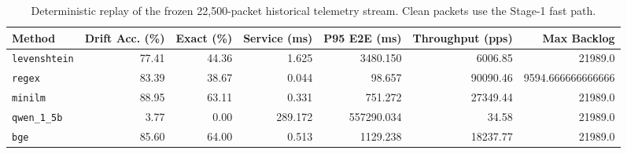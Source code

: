 \begin{table}[t]
\centering
\small
\begin{tabular}{lrrrrrr}
\toprule
Method & Drift Acc. (\%) & Exact (\%) & Service (ms) & P95 E2E (ms) & Throughput (pps) & Max Backlog \\
\midrule
\texttt{levenshtein} & 77.41 & 44.36 & 1.625 & 3480.150 & 6006.85 & 21989.0 \\
\texttt{regex} & 83.39 & 38.67 & 0.044 & 98.657 & 90090.46 & 9594.666666666666 \\
\texttt{minilm} & 88.95 & 63.11 & 0.331 & 751.272 & 27349.44 & 21989.0 \\
\texttt{qwen\_1\_5b} & 3.77 & 0.00 & 289.172 & 557290.034 & 34.58 & 21989.0 \\
\texttt{bge} & 85.60 & 64.00 & 0.513 & 1129.238 & 18237.77 & 21989.0 \\
\bottomrule
\end{tabular}
\caption{Deterministic replay of the frozen 22,500-packet historical telemetry stream. Clean packets use the Stage-1 fast path.}
\label{tab:frozen-stream-replay}
\end{table}
